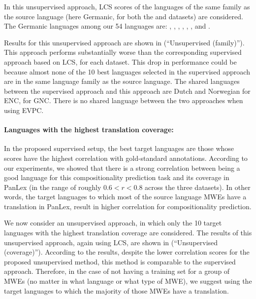 \documentclass[output=paper,modfonts,nonflat]{langsci/langscibook}
\begin{document}
In this unsupervised approach, LCS scores of the languages of the same
family as the source language (here Germanic, for both the  and
 datasets) are considered. The Germanic languages among our 54
languages are: , , , , ,
,  and .

Results for this unsupervised approach are shown in
 (``Unsupervised (family)''). This
approach performs substantially worse than the corresponding
supervised approach based on LCS, for each dataset. This drop in
performance could be because almost none of the 10 best languages
selected in the supervised approach are in the same language family as
the source language. The shared languages between the supervised approach
and this approach are Dutch and Norwegian for ENC,  for GNC. 
There is no shared language between the two approaches when using EVPC.


\paragraph*{Languages with the highest translation coverage:}

In the proposed supervised setup, the best target languages are those
whose scores have the highest correlation with gold-standard
annotations.  According to our experiments, we showed that there is a
strong correlation between being a good language for this
compositionality prediction task and its coverage in PanLex (in the
range of roughly $0.6 < r < 0.8$ across the three datasets). In other words, the
target languages to which most of the source language MWEs have a
translation in PanLex, result in higher correlation for
compositionality prediction.

We now consider an unsupervised approach, in which only the 10
target languages with the highest translation coverage are
considered. The results of this unsupervised approach, again using
LCS, are shown in  (``Unsupervised
(coverage)''). According to the results, despite the lower correlation
scores for the proposed unsupervised method, this method is comparable
to the supervised approach.  Therefore, in the case of not having a
training set for a group of MWEs (no matter in what language or what
type of MWE), we suggest using the target languages to which the
majority of those MWEs have a translation.
\end{document}
